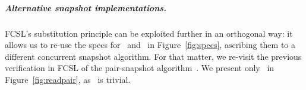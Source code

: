 








\subparagraph*{Alternative snapshot implementations.}
FCSL's substitution principle can be exploited further in an
orthogonal way: it allows us to re-use the specs for \jywrite\ and
\jyscan\ in Figure~\ref{fig:specs}, ascribing them to a different
concurrent snapshot algorithm. For that matter, we re-visit the
previous verification in FCSL of the pair-snapshot
algorithm~\cite{SergeyNB+ESOP15}. We present only \jyscan\ in
Figure~\ref{fig:readpair}, as \jywrite\ is trivial.

